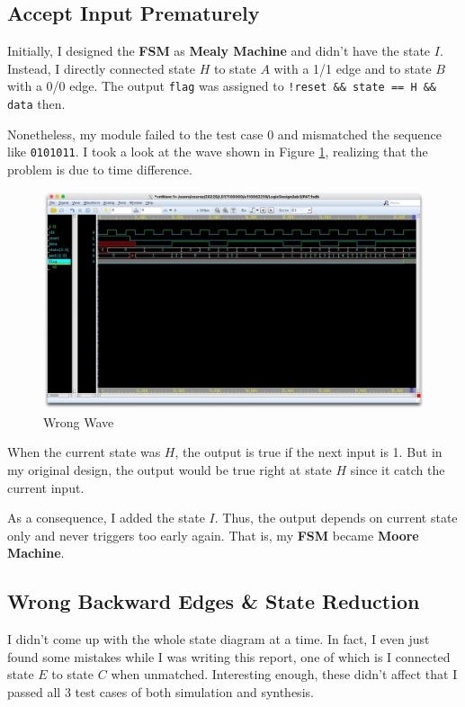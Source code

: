 \documentclass[12pt, a4paper]{article}
\begin{document}
\subsection{Accept Input Prematurely}

Initially, I designed the \textbf{FSM} as \textbf{Mealy Machine} and didn't have the state $I$. Instead, I directly connected state $H$ to state $A$ with a 1/1 edge and to state $B$ with a 0/0 edge. The output \texttt{flag} was assigned to \texttt{!reset \&\& state == H \&\& data} then.

Nonetheless, my module failed to the test case 0 and mismatched the sequence like \texttt{0101011}. I took a look at the wave shown in Figure \ref{ww}, realizing that the problem is due to time difference.

\begin{figure}[htbp]
\centering
\includegraphics[width=.85\textwidth]{wrong_wave.jpg}
\caption{Wrong Wave}
\label{ww}
\end{figure}

When the current state was $H$, the output is \textsf{true} if the next input is 1. But in my original design, the output would be \textsf{true} right at state $H$ since it catch the current input.

As a consequence, I added the state $I$. Thus, the output depends on  current state only and never triggers too early again. That is, my \textbf{FSM} became \textbf{Moore Machine}.

\subsection{Wrong Backward Edges \& State Reduction}

I didn't come up with the whole state diagram at a time. In fact, I even just found some mistakes while I was writing this report, one of which is I connected state $E$ to state $C$ when unmatched. Interesting enough, these didn't affect that I passed all 3 test cases of both simulation and synthesis.
\end{document}
